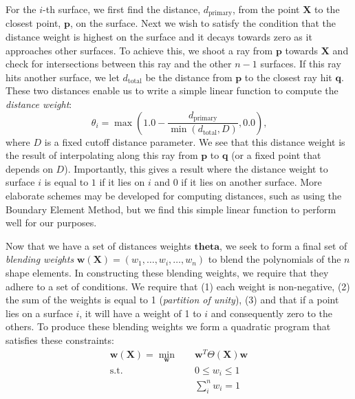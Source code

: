 For the $i$-th surface, we first find the distance, $d_{\text{primary}}$, from the point $\mathbf{X}$ to the closest point, $\mathbf{p}$, on the surface. Next we wish to satisfy the condition that the distance weight is highest on the surface and it decays towards zero as it approaches other surfaces. To achieve this, we shoot a ray from $\mathbf{p}$ towards $\mathbf{X}$ and check for intersections between this ray and the other $n-1$ surfaces. If this ray hits another surface, we let $d_{\text{total}}$ be the distance from $\mathbf{p}$ to the closest ray hit $\mathbf{q}$. These two distances enable us to write a simple linear function to compute the \textit{distance weight}:
\begin{equation}
\theta_i = \max (1.0 - \frac{d_{\text{primary}}}{\min (d_{\text{total}}, D)}, 0.0)
\text{,}
\end{equation}
where $D$ is a fixed cutoff distance parameter. We see that this distance weight is the result of interpolating along this ray from $\mathbf{p}$ to $\mathbf{q}$ (or a fixed point that depends on $D$). Importantly, this gives a result where the distance weight to surface $i$ is equal to $1$ if it lies on $i$ and $0$ if it lies on another surface. More elaborate schemes may be developed for computing distances, such as using the Boundary Element Method, but we find this simple linear function to perform well for our purposes.

Now that we have a set of distances weights $\mathbf{theta}$, we seek to form a final set of \textit{blending weights} $\mathbf{w}(\mathbf{X}) =  \left( w_1, \dots, w_i, \dots, w_n \right)$ to blend the polynomials of the $n$ shape elements. In constructing these blending weights, we require that they adhere to a set of conditions. We require that (1) each weight is non-negative, (2) the sum of the weights is equal to 1 (\textit{partition of unity}), (3) and that if a point lies on a surface $i$, it will have a weight of 1 to $i$ and consequently zero to the others. To produce these blending weights we form a quadratic program that satisfies these constraints:
\begin{equation}
\begin{aligned}
\mathbf{w}(\mathbf{X}) = \min_{\mathbf{w}} \quad & \mathbf{w}^T \Theta(\mathbf{X}) \mathbf{w}    \\
\textrm{s.t.} \quad & 0 \leq w_i \leq 1                     \\
                    &   \sum_i^n w_i = 1                      \\
\end{aligned}
\end{equation}

